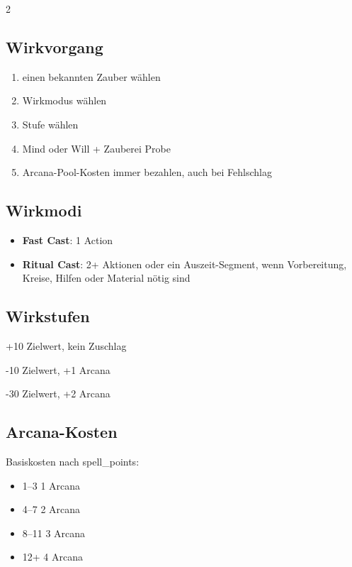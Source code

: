 \begin{multicols*}{2}
\subsection{Wirkvorgang}
\begin{enumerate}[leftmargin=*]
\item einen bekannten Zauber wählen
\item Wirkmodus wählen
\item Stufe wählen
\item Mind oder Will + Zauberei Probe
\item Arcana-Pool-Kosten immer bezahlen, auch bei Fehlschlag
\end{enumerate}

\subsection{Wirkmodi}
\begin{itemize}[leftmargin=*]
\item \textbf{Fast Cast}: 1 Action
\item \textbf{Ritual Cast}: 2+ Aktionen oder ein Auszeit-Segment, wenn Vorbereitung, Kreise, Hilfen oder Material nötig sind
\end{itemize}

\subsection{Wirkstufen}
\begin{description}[style=nextline,leftmargin=0pt]
\item[\textbf{Minor}] +10 Zielwert, kein Zuschlag
\item[\textbf{Severe}] -10 Zielwert, +1 Arcana
\item[\textbf{Catastrophic}] -30 Zielwert, +2 Arcana
\end{description}

\subsection{Arcana-Kosten}
Basiskosten nach spell\_points:
\begin{itemize}[leftmargin=*]
\item 1--3 \textrightarrow{} 1 Arcana
\item 4--7 \textrightarrow{} 2 Arcana
\item 8--11 \textrightarrow{} 3 Arcana
\item 12+ \textrightarrow{} 4 Arcana
\end{itemize}


\end{multicols*}
